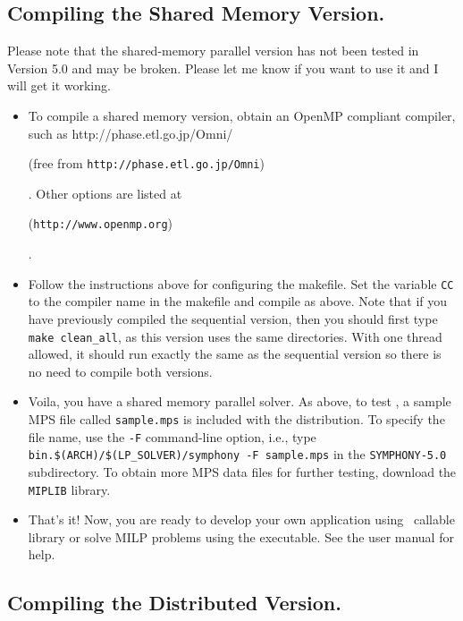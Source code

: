 \subsection{Compiling the Shared Memory Version.}

Please note that the shared-memory parallel version has not been tested in
Version 5.0 and may be broken. Please let me know if you want to use it and I
will get it working. 

\begin{itemize}
        \item To compile a shared memory version, obtain an OpenMP
        compliant compiler, such as 
        {http://phase.etl.go.jp/Omni/}
\begin{latexonly} 
        (free from {\tt http://phase.etl.go.jp/Omni})
\end{latexonly}. 
        Other options are listed at 
\begin{latexonly}
        ({\tt http://www.openmp.org})
\end{latexonly}.

        \item Follow the instructions above for configuring the makefile. Set
the variable {\tt CC} to the compiler name in the makefile and compile as
above. Note that if you have previously compiled the sequential version, then
you should first type {\tt  make clean\_all}, as this version uses the same
directories.  With one thread allowed, it should run exactly the same as the
sequential version so there is no need to compile both versions.

        \item Voila, you have a shared memory parallel solver. As above, to
test \BB, a sample MPS file called \texttt{sample.mps} is included with 
the distribution. To specify the file name, use the \texttt{-F} command-line 
option, i.e., type \texttt{bin.\$(ARCH)/\$(LP\_SOLVER)/symphony -F sample.mps}
in the \texttt{SYMPHONY-5.0} subdirectory. To obtain more MPS data files for 
further testing, download the \texttt{MIPLIB} library.

\item That's it! Now, you are ready to develop your own application using 
\BB\ callable library or solve MILP problems using the executable. See the
user manual for help.

\end{itemize}

\subsection{Compiling the Distributed Version.}

